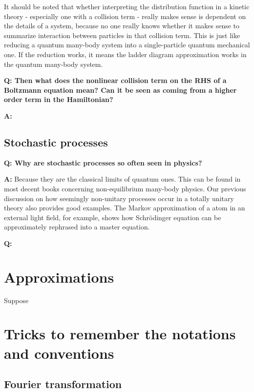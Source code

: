 \documentclass[hyperref, a4paper]{article}
\newenvironment{qanda}{\setlength{\parindent}{0pt}}{\bigskip}
\newcommand{\Q}{\bigskip\bfseries Q: }
\newcommand{\A}{\par\textbf{A:} \normalfont}
\begin{document}
\begin{qanda}
It should be noted that whether interpreting the distribution function in a kinetic theory - especially one with
a collision term - really makes sense is dependent on the details of a system, because no one really knows 
whether it makes sense to summarize interaction between particles in that collision term.
This is just like reducing a quantum many-body system into a single-particle quantum mechanical one.
If the reduction works, it means the ladder diagram approximation works in the quantum many-body system.

\Q Then what does the nonlinear collision term on the RHS of a Boltzmann equation mean? Can it be seen as coming 
from a higher order term in the Hamiltonian?
\A 

\end{qanda}

\subsection{Stochastic processes}

\begin{qanda}
    
\Q Why are stochastic processes so often seen in physics?
\A Because they are the classical limits of quantum ones. This can be found in most decent books concerning non-equilibrium many-body physics.
Our previous discussion on how seemingly non-unitary processes occur in a totally unitary theory also provides 
good examples. The Markov approximation of a atom in an external light field, for example, shows how Schrödinger 
equation can be approximately rephrased into a master equation. 

\Q 

\end{qanda}

\section{Approximations}

Suppose 

\section{Tricks to remember the notations and conventions}

\subsection{Fourier transformation}
\end{document}
